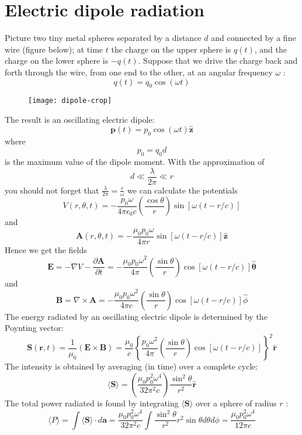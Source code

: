  \section{Electric dipole radiation}
 Picture two tiny metal spheres separated by a distance $d$ and connected by a fine wire (figure below); at time $t$ the charge on the upper sphere is $q(t)$, and the charge on the lower sphere is $-q(t)$. Suppose that we drive the charge back and forth through the wire, from one end to the other, at an angular frequency $\omega$ :
 $$
 q(t)=q_{0} \cos (\omega t)
 $$
 \begin{figure}[H]
 	\centering
 	\texttt{[image: dipole-crop]}
 	\caption{}
 	\label{}
 \end{figure}
 The result is an oscillating electric dipole:
 $$
 \mathbf{p}(t)=p_{0} \cos (\omega t) \hat{\mathbf{z}}
 $$
 where
 $$
 p_{0}=q_{0} d
 $$
 is the maximum value of the dipole moment.
 With the approximation of
 $$
 d \ll \frac{\lambda}{2 \pi} \ll r
 $$
 you should not forget that $\frac{\lambda}{2 \pi}=\frac{c}{\omega}$ we can calculate the potentials\\
 $$
 V(r, \theta, t)=-\frac{p_{0} \omega}{4 \pi \epsilon_{0} c}\left(\frac{\cos \theta}{r}\right) \sin [\omega(t-r / c)]
 $$
 and
 $$
 \mathbf{A}(r, \theta, t)=-\frac{\mu_{0} p_{0} \omega}{4 \pi r} \sin [\omega(t-r / c)] \hat{\mathbf{z}}
 $$
 Hence we get the fields
 $$
 \mathbf{E}=-\nabla V-\frac{\partial \mathbf{A}}{\partial t}=-\frac{\mu_{0} p_{0} \omega^{2}}{4 \pi}\left(\frac{\sin \theta}{r}\right) \cos [\omega(t-r / c)] \hat{\boldsymbol{\theta}}
 $$
 and
 $$
 \mathbf{B}=\nabla \times \mathbf{A}=-\frac{\mu_{0} p_{0} \omega^{2}}{4 \pi c}\left(\frac{\sin \theta}{r}\right) \cos [\omega(t-r / c)] \hat{\phi}
 $$
 The energy radiated by an oscillating electric dipole is determined by the Poynting vector:
 $$\mathbf{S}(\mathbf{r}, t)=\frac{1}{\mu_{0}}(\mathbf{E} \times \mathbf{B})=\frac{\mu_{0}}{c}\left\{\frac{p_{0} \omega^{2}}{4 \pi}\left(\frac{\sin \theta}{r}\right) \cos [\omega(t-r / c)]\right\}^{2} \hat{\mathbf{r}}$$
 The intensity is obtained by averaging (in time) over a complete cycle:
 $$\langle\mathbf{S}\rangle=\left(\frac{\mu_{0} p_{0}^{2} \omega^{4}}{32 \pi^{2} c}\right) \frac{\sin ^{2} \theta}{r^{2}} \hat{\mathbf{r}}$$
 The total power radiated is found by integrating $\langle\mathbf{S}\rangle$ over a sphere of radius $r$ :
$$ \langle P\rangle=\int\langle\mathbf{S}\rangle \cdot d \mathbf{a}=\frac{\mu_{0} p_{0}^{2} \omega^{4}}{32 \pi^{2} c} \int \frac{\sin ^{2} \theta}{r^{2}} r^{2} \sin \theta d \theta d \phi=\frac{\mu_{0} p_{0}^{2} \omega^{4}}{12 \pi c}$$
